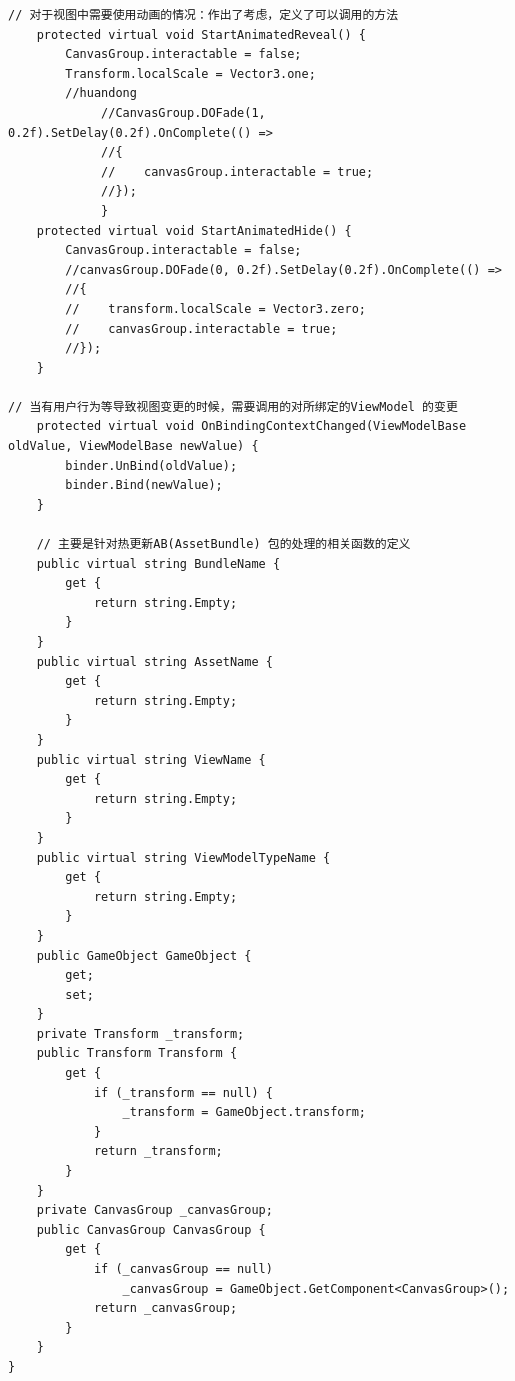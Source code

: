 \documentclass[9pt, b5paper]{article}
\begin{document}
\begin{verbatim}
// 对于视图中需要使用动画的情况：作出了考虑，定义了可以调用的方法    
    protected virtual void StartAnimatedReveal() {
        CanvasGroup.interactable = false;
        Transform.localScale = Vector3.one;
        //huandong
             //CanvasGroup.DOFade(1, 0.2f).SetDelay(0.2f).OnComplete(() =>
             //{
             //    canvasGroup.interactable = true;
             //});
             }
    protected virtual void StartAnimatedHide() {
        CanvasGroup.interactable = false;
        //canvasGroup.DOFade(0, 0.2f).SetDelay(0.2f).OnComplete(() =>
        //{
        //    transform.localScale = Vector3.zero;
        //    canvasGroup.interactable = true;
        //});
    }
    
// 当有用户行为等导致视图变更的时候，需要调用的对所绑定的ViewModel 的变更
    protected virtual void OnBindingContextChanged(ViewModelBase oldValue, ViewModelBase newValue) {
        binder.UnBind(oldValue);
        binder.Bind(newValue);
    }

    // 主要是针对热更新AB(AssetBundle) 包的处理的相关函数的定义
    public virtual string BundleName {
        get {
            return string.Empty;
        }
    }
    public virtual string AssetName {
        get {
            return string.Empty;
        }
    }
    public virtual string ViewName {
        get {
            return string.Empty;
        }
    }
    public virtual string ViewModelTypeName {
        get {
            return string.Empty;
        }
    }
    public GameObject GameObject {
        get;
        set;
    }
    private Transform _transform;
    public Transform Transform {
        get {
            if (_transform == null) {
                _transform = GameObject.transform;
            }
            return _transform;
        }
    }
    private CanvasGroup _canvasGroup;
    public CanvasGroup CanvasGroup {
        get {
            if (_canvasGroup == null) 
                _canvasGroup = GameObject.GetComponent<CanvasGroup>();
            return _canvasGroup;
        }
    }
}
\end{verbatim}
\end{document}
